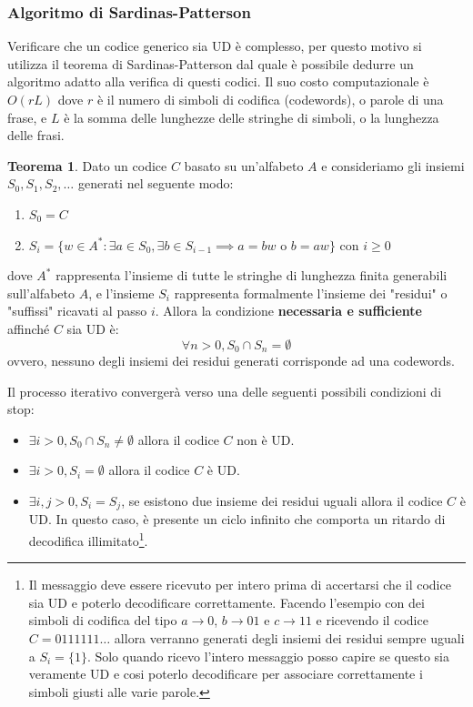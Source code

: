 \documentclass{article}
\theoremstyle{definition}
\newtheorem{theorem}{Teorema}[section] %
\numberwithin{equation}{section}
\begin{document}
\subsubsection{Algoritmo di Sardinas-Patterson}
Verificare che un codice generico sia UD è complesso, per questo motivo si utilizza il teorema di Sardinas-Patterson dal quale è possibile dedurre un algoritmo adatto alla verifica di questi codici. Il suo costo computazionale è $O(rL)$ dove $r$ è il numero di simboli di codifica (codewords), o parole di una frase, e $L$ è la somma delle lunghezze delle stringhe di simboli, o la lunghezza delle frasi.
\begin{theorem}\label{theorem_sardinas_patterson}
    Dato un codice $C$ basato su un'alfabeto $A$ e consideriamo gli insiemi $S_0,S_1,S_2,\ldots$ generati nel seguente modo:
    \begin{enumerate}
        \item $S_0=C$
        \item $S_i=\{w\in A^* : \exists a\in S_0,\exists b\in S_{i-1} \implies a=bw \text{ o } b=aw\}$ con $i\geq 0$
    \end{enumerate}
    dove $A^*$ rappresenta l'insieme di tutte le stringhe di lunghezza finita generabili sull'alfabeto $A$, e l'insieme $S_i$ rappresenta formalmente l'insieme dei "residui" o "suffissi" ricavati al passo $i$. Allora la condizione \textbf{necessaria e sufficiente} affinché $C$ sia UD è:
    \[
        \forall n>0, S_0 \cap S_n=\emptyset
    \]
    ovvero, nessuno degli insiemi dei residui generati corrisponde ad una codewords.
\end{theorem}
Il processo iterativo convergerà verso una delle seguenti possibili condizioni di stop:
\begin{itemize}
    \item $\exists i>0, S_0 \cap S_n \ne\emptyset$ allora il codice $C$ non è UD.
    \item $\exists i>0, S_i=\emptyset$ allora il codice $C$ è UD.
    \item $\exists i,j>0, S_i=S_j$, se esistono due insieme dei residui uguali allora il codice $C$ è UD. In questo caso, è presente un ciclo infinito che comporta un ritardo di decodifica illimitato\footnote{Il messaggio deve essere ricevuto per intero prima di accertarsi che il codice sia UD e poterlo decodificare correttamente. Facendo l'esempio con dei simboli di codifica del tipo $a\xrightarrow{}0$, $b\xrightarrow{}01$ e $c\xrightarrow{}11$ e ricevendo il codice $C=0111111\ldots$ allora verranno generati degli insiemi dei residui sempre uguali a $S_i=\{1\}$. Solo quando ricevo l'intero messaggio posso capire se questo sia veramente UD e cosi poterlo decodificare per associare correttamente i simboli giusti alle varie parole.}.
\end{itemize}
\end{document}
